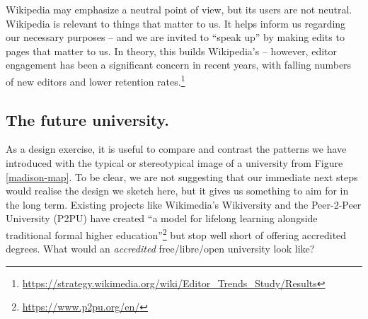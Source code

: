 %
%
Wikipedia may emphasize a neutral point of view, but its users are not
neutral.
%
%
%
Wikipedia is relevant to things that matter to us.  It helps inform us
regarding our necessary purposes -- and we are invited to ``speak up''
by making edits to pages that matter to us.  In theory, this builds
Wikipedia's  -- however, editor
engagement has been a significant concern in recent years, with
falling numbers of new editors and lower retention
rates.\footnote{\url{https://strategy.wikimedia.org/wiki/Editor_Trends_Study/Results}}
%



\subsection{The future university.}
As a design exercise, it is useful to compare and contrast the
patterns we have introduced with the typical or stereotypical image of
a university from Figure \ref{madison-map}.  To be clear, we are not
suggesting that our immediate next steps would realise the design we
sketch here, but it gives us something to aim for in the long term.
%
Existing projects like Wikimedia's Wikiversity and the Peer-2-Peer
University (P2PU) have created ``a model for lifelong learning
alongside traditional formal higher
education''\footnote{\url{https://www.p2pu.org/en/}} but stop well
short of offering accredited degrees.  What would an \emph{accredited}
free/libre/open university look like?

